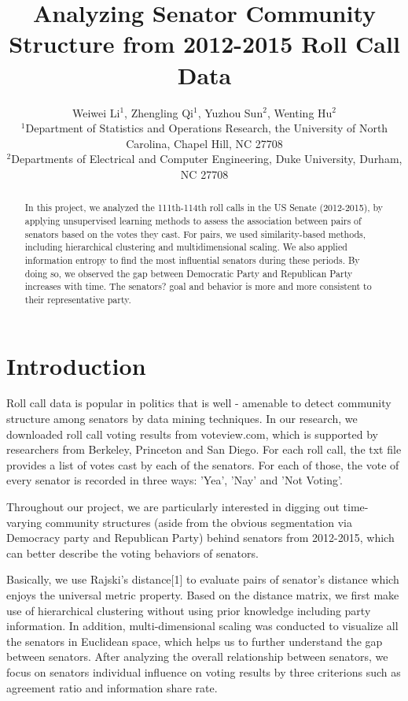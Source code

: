 \documentclass{article} %
\title{Analyzing Senator Community Structure from 2012-2015 Roll Call Data}
\author{
Weiwei Li$^1$, Zhengling Qi$^1$, Yuzhou Sun$^2$, Wenting Hu$^2$\\
$^1$Department of Statistics and Operations Research, the University of North Carolina, Chapel Hill, NC 27708\\ 
$^2$Departments of Electrical and Computer Engineering, Duke University, Durham, NC 27708\\
}
\begin{document}
\maketitle

\begin{abstract}
 In this project, we analyzed the 111th-114th roll calls in the US Senate (2012-2015), by applying unsupervised learning methods to assess the association between pairs of senators based on the votes they cast. For pairs, we used similarity-based methods, including hierarchical clustering and multidimensional scaling. We also applied information entropy to find the most influential senators during these periods. By doing so, we observed the gap between Democratic Party and Republican Party increases with time. The senators? goal and behavior is more and more consistent to their representative party.
\end{abstract}

\section{Introduction}
Roll call data is popular in politics that is well - amenable to detect community structure among senators by data mining techniques. In our research, we downloaded roll call voting results from voteview.com, which is supported by researchers from Berkeley, Princeton and San Diego. For each roll call, the txt file provides a list of votes cast by each of the senators. For each of those, the vote of every senator is recorded in three ways: 'Yea', 'Nay' and 'Not Voting'.

Throughout our project, we are particularly interested in digging out time-varying community structures (aside from the obvious segmentation via Democracy party and Republican Party) behind senators from 2012-2015, which can better describe the voting behaviors of senators.

Basically, we use Rajski's distance[1] to evaluate pairs of senator's distance which enjoys the universal metric property. Based on the distance matrix, we first make use of hierarchical clustering without using prior knowledge including party information. In addition, multi-dimensional scaling was conducted to visualize all the senators in Euclidean space, which helps us to further understand the gap between senators. After analyzing the overall relationship between senators, we focus on senators individual influence on voting results by three criterions such as agreement ratio and information share rate.
\end{document}
